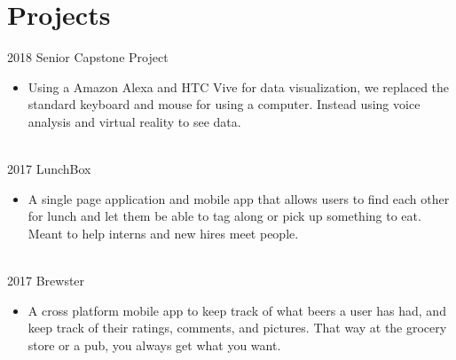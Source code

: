 \documentclass[letterpaper]{twentysecondcv} %
\begin{document}
\section{Projects}
\begin{twenty} %

\twentyitem
    	{2018}
		{}
        {Senior Capstone Project}
        {}
        {}
        {\begin{itemize}
        \item Using a Amazon Alexa and HTC Vive for data visualization, we replaced the standard keyboard and mouse for using a computer. Instead using voice analysis and virtual reality to see data.
        \end{itemize}}
        \\

\twentyitem
    	{2017}
		{}
        {LunchBox}
        {}
        {}
        {\begin{itemize}
        \item A single page application and mobile app that allows users to find each other for lunch and let them be able to tag along or pick up something to eat. Meant to help interns and new hires meet people.
        \end{itemize}}
        \\
\twentyitem
    	{2017}
		{}
        {Brewster}
        {}
        {}
        {\begin{itemize}
        \item A cross platform mobile app to keep track of what beers a user has had, and keep track of their ratings, comments, and pictures. That way at the grocery store or a pub, you always get what you want.
        \end{itemize}}
\end{twenty}
\end{document}
